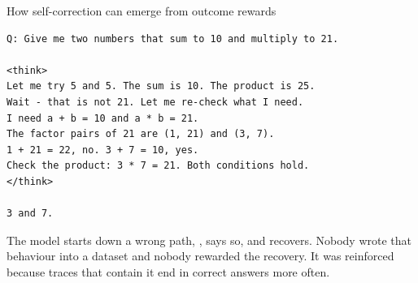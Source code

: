 \documentclass[aspectratio=169,10pt]{beamer}
\begin{document}
\begin{frame}[fragile]{How self-correction can emerge from outcome rewards}
\begin{lstlisting}
Q: Give me two numbers that sum to 10 and multiply to 21.

<think>
Let me try 5 and 5. The sum is 10. The product is 25.
Wait - that is not 21. Let me re-check what I need.
I need a + b = 10 and a * b = 21.
The factor pairs of 21 are (1, 21) and (3, 7).
1 + 21 = 22, no. 3 + 7 = 10, yes.
Check the product: 3 * 7 = 21. Both conditions hold.
</think>

3 and 7.
\end{lstlisting}
  \vspace{0.2em}
  \small
  The model starts down a wrong path, , says so, and recovers.
  Nobody wrote that behaviour into a dataset and nobody rewarded the
  recovery. It was reinforced because traces that contain it end in correct
  answers more often.
\end{frame}
\end{document}
